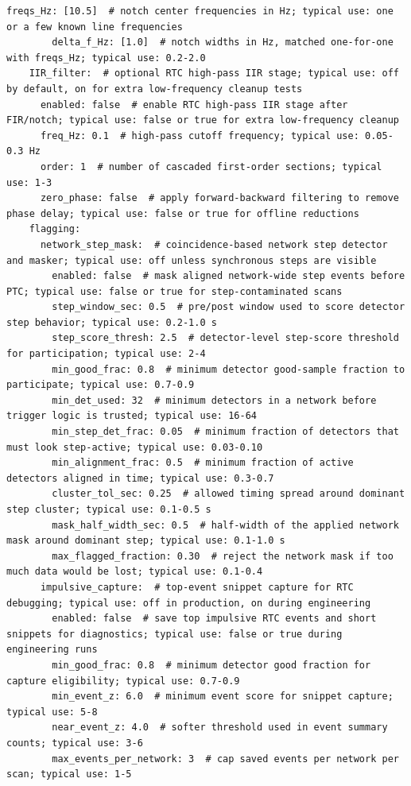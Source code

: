 \documentclass[11pt]{article}
\begin{document}
\begin{lstlisting}[language={}]
        freqs_Hz: [10.5]  # notch center frequencies in Hz; typical use: one or a few known line frequencies
        delta_f_Hz: [1.0]  # notch widths in Hz, matched one-for-one with freqs_Hz; typical use: 0.2-2.0
    IIR_filter:  # optional RTC high-pass IIR stage; typical use: off by default, on for extra low-frequency cleanup tests
      enabled: false  # enable RTC high-pass IIR stage after FIR/notch; typical use: false or true for extra low-frequency cleanup
      freq_Hz: 0.1  # high-pass cutoff frequency; typical use: 0.05-0.3 Hz
      order: 1  # number of cascaded first-order sections; typical use: 1-3
      zero_phase: false  # apply forward-backward filtering to remove phase delay; typical use: false or true for offline reductions
    flagging:
      network_step_mask:  # coincidence-based network step detector and masker; typical use: off unless synchronous steps are visible
        enabled: false  # mask aligned network-wide step events before PTC; typical use: false or true for step-contaminated scans
        step_window_sec: 0.5  # pre/post window used to score detector step behavior; typical use: 0.2-1.0 s
        step_score_thresh: 2.5  # detector-level step-score threshold for participation; typical use: 2-4
        min_good_frac: 0.8  # minimum detector good-sample fraction to participate; typical use: 0.7-0.9
        min_det_used: 32  # minimum detectors in a network before trigger logic is trusted; typical use: 16-64
        min_step_det_frac: 0.05  # minimum fraction of detectors that must look step-active; typical use: 0.03-0.10
        min_alignment_frac: 0.5  # minimum fraction of active detectors aligned in time; typical use: 0.3-0.7
        cluster_tol_sec: 0.25  # allowed timing spread around dominant step cluster; typical use: 0.1-0.5 s
        mask_half_width_sec: 0.5  # half-width of the applied network mask around dominant step; typical use: 0.1-1.0 s
        max_flagged_fraction: 0.30  # reject the network mask if too much data would be lost; typical use: 0.1-0.4
      impulsive_capture:  # top-event snippet capture for RTC debugging; typical use: off in production, on during engineering
        enabled: false  # save top impulsive RTC events and short snippets for diagnostics; typical use: false or true during engineering runs
        min_good_frac: 0.8  # minimum detector good fraction for capture eligibility; typical use: 0.7-0.9
        min_event_z: 6.0  # minimum event score for snippet capture; typical use: 5-8
        near_event_z: 4.0  # softer threshold used in event summary counts; typical use: 3-6
        max_events_per_network: 3  # cap saved events per network per scan; typical use: 1-5

\end{lstlisting}
\end{document}
